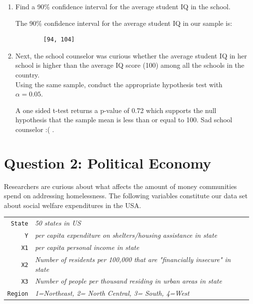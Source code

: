 \documentclass[12pt,letterpaper]{article}
\begin{document}
\begin{enumerate}
	\item Find a 90\% confidence interval for the average student IQ in the school.\\
	
	  
	
	\vspace{.25cm}
	
	\noindent  The 90\% confidence interval for the average student IQ in our sample is:
	\begin{verbatim}
		[94, 104]
		\end{verbatim}
		
		\newpage
	
	\item Next, the school counselor was curious  whether  the average student IQ in her school is higher than the average IQ score (100) among all the schools in the country.\\
	
	\noindent Using the same sample, conduct the appropriate hypothesis test with $\alpha=0.05$.
	\vspace{.25cm}

	  
	\vspace{.25cm}
	
	\noindent  A one sided t-test returns a p-value of 0.72  which supports the null hypothesis that the sample mean is less than or equal to 100.  Sad school counselor :( .
	
\end{enumerate}

\newpage

	\section*{Question 2: Political Economy}

\noindent Researchers are curious about what affects the amount of money communities spend on addressing homelessness. The following variables constitute our data set about social welfare expenditures in the USA. \\
\vspace{.5cm}


\begin{tabular}{r|l}
	\texttt{State} &\emph{50 states in US} \\
	\texttt{Y} & \emph{per capita expenditure on shelters/housing assistance in state}\\
	\texttt{X1} &\emph{per capita personal income in state} \\
	\texttt{X2} &  \emph{Number of residents per 100,000 that are "financially insecure" in state}\\
	\texttt{X3} &  \emph{Number of people per thousand residing in urban areas in state} \\
	\texttt{Region} &  \emph{1=Northeast, 2= North Central, 3= South, 4=West} \\
\end{tabular}
\end{document}
